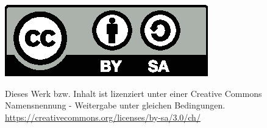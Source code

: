 \begin{center}
   \begin{minipage}[tc]{0.3\textwidth}
      \includegraphics[width=\textwidth]{images/by-sa}
   \end{minipage}
   \begin{minipage}[tc]{0.1\textwidth}
   \end{minipage}
   \begin{minipage}[tc]{0.6\textwidth}
      Dieses Werk bzw. Inhalt ist lizenziert unter einer Creative Commons Namensnennung - Weitergabe unter gleichen Bedingungen. \url{https://creativecommons.org/licenses/by-sa/3.0/ch/}
   \end{minipage}

\end{center}
\thispagestyle{empty}
\rmfamily
\cleardoublepage

\setcounter{tocdepth}{3}
\tableofcontents	%
